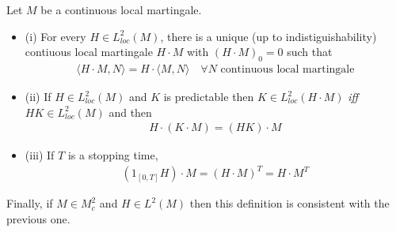 \documentclass[12pt,a4paper]{article}
\renewenvironment{i}
{\begin{itemize} 
	}%
	{\end{itemize}
}
\begin{document}
\thm Let $M$ be a continuous local martingale.
\begin{i}
\item[(i)] For every $H \in L^2_{loc}(M)$, there is a unique (up to indistiguishability) contiuous local martingale $H\cdot M$ with $(H\cdot M)_0 =0$ such that
\begin{align*}
\langle H \cdot M, N \rangle = H \cdot \langle M, N\rangle \quad \forall N \text{ continuous local martingale}
\end{align*}
\item[(ii)] If $H\in L_{loc}^2(M)$ and $K$ is predictable then $K\in L^2_{loc}(H \cdot M)$ \emph{iff} $HK\in L^2_{loc}(M)$ and then
\begin{align*}
H \cdot (K \cdot M) = (HK) \cdot M
\end{align*}
\item[(iii)] If $T$ is a stopping time,
\begin{align*}
(1_{[0, T]} H)\cdot M = (H \cdot M)^T = H\cdot M^T
\end{align*}
\end{i}
Finally, if $M\in M^2_c$ and $H\in L^2(M)$ then this definition is consistent with the previous one. 
\end{document}
